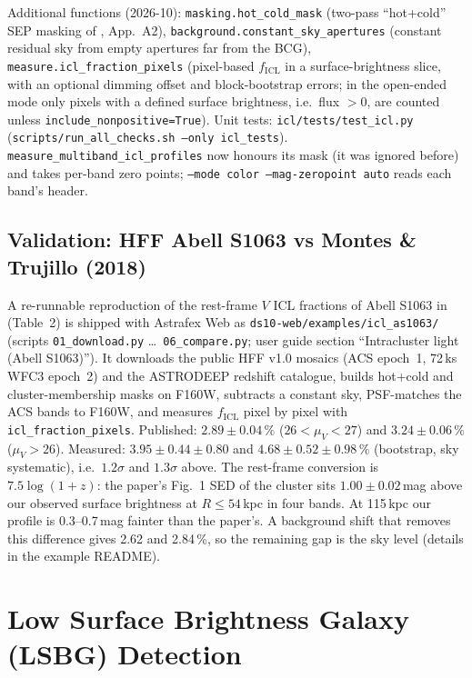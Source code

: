 \documentclass[11pt,fleqn]{book}
\begin{document}
Additional functions (2026-10): \texttt{masking.hot\_cold\_mask} (two-pass ``hot+cold'' SEP masking of
\textcite{montes2018}, App.~A2), \texttt{background.constant\_sky\_apertures} (constant residual sky from empty
apertures far from the BCG), \texttt{measure.icl\_fraction\_pixels} (pixel-based $f_\mathrm{ICL}$ in a
surface-brightness slice, with an optional dimming offset and block-bootstrap errors; in the open-ended mode only
pixels with a defined surface brightness, i.e.\ flux $>0$, are counted unless \texttt{include\_nonpositive=True}).
Unit tests:
\texttt{icl/tests/test\_icl.py} (\texttt{scripts/run\_all\_checks.sh --only icl\_tests}).
\texttt{measure\_multiband\_icl\_profiles} now honours its mask (it was ignored before) and takes per-band zero
points; \texttt{--mode color --mag-zeropoint auto} reads each band's header.

\section{Validation: HFF Abell S1063 vs Montes \& Trujillo (2018)}
\label{sec:icl_as1063}
A re-runnable reproduction of the rest-frame $V$ ICL fractions of Abell S1063 in \textcite{montes2018} (Table~2) is
shipped with Astrafex Web as \texttt{ds10-web/examples/icl\_as1063/} (scripts \texttt{01\_download.py} \ldots\
\texttt{06\_compare.py}; user guide section ``Intracluster light (Abell S1063)''). It downloads the public HFF
v1.0 mosaics (ACS epoch~1, 72\,ks WFC3 epoch~2) and the ASTRODEEP redshift catalogue, builds hot+cold and
cluster-membership masks on F160W, subtracts a constant sky, PSF-matches the ACS bands to F160W, and measures
$f_\mathrm{ICL}$ pixel by pixel with \texttt{icl\_fraction\_pixels}. Published: $2.89\pm0.04\,\%$ ($26<\mu_V<27$)
and $3.24\pm0.06\,\%$ ($\mu_V>26$). Measured: $3.95\pm0.44\pm0.80$ and $4.68\pm0.52\pm0.98\,\%$ (bootstrap, sky
systematic), i.e.\ $1.2\sigma$ and $1.3\sigma$ above. The rest-frame conversion is $7.5\log(1+z)$: the paper's
Fig.~1 SED of the cluster sits $1.00\pm0.02$\,mag above our observed surface brightness at $R\le54$\,kpc in four
bands. At 115\,kpc our profile is 0.3--0.7\,mag fainter than the paper's. A background shift that removes this
difference gives 2.62 and 2.84\,\%, so the remaining gap is the sky level (details in the example README).


\chapter{Low Surface Brightness Galaxy (LSBG) Detection}
\label{ch:lsbg}
\end{document}
